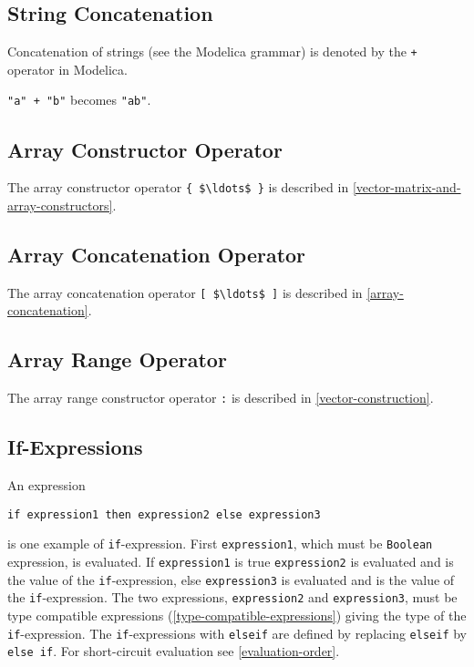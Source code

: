 \subsection{String Concatenation}\label{string-concatenation}

Concatenation of strings (see the Modelica grammar) is denoted by the \lstinline!+! operator in Modelica.

\begin{example}
\lstinline!"a" + "b"! becomes \lstinline!"ab"!.
\end{example}

\subsection{Array Constructor Operator}\label{array-constructor-operator}

The array constructor operator \lstinline!{ $\ldots$ }! is described in \cref{vector-matrix-and-array-constructors}.

\subsection{Array Concatenation Operator}\label{array-concatenation-operator}

The array concatenation operator \lstinline![ $\ldots$ ]! is described in \cref{array-concatenation}.

\subsection{Array Range Operator}\label{array-range-operator}

The array range constructor operator \lstinline!:! is described in \cref{vector-construction}.

\subsection{If-Expressions}\label{if-expressions}

An expression
\begin{lstlisting}[language=modelica]
if expression1 then expression2 else expression3
\end{lstlisting}%
 is one example of \lstinline!if!-expression.
First \lstinline!expression1!, which must be \lstinline!Boolean! expression, is evaluated.
If \lstinline!expression1! is true \lstinline!expression2! is evaluated and is the value of the \lstinline!if!-expression, else \lstinline!expression3! is evaluated and is the value of the \lstinline!if!-expression.
The two expressions, \lstinline!expression2! and \lstinline!expression3!, must be type compatible expressions (\cref{type-compatible-expressions}) giving the type of the \lstinline!if!-expression.
The \lstinline!if!-expressions with \lstinline!elseif! are defined by replacing \lstinline!elseif! by \lstinline!else if!.
For short-circuit evaluation see \cref{evaluation-order}.

